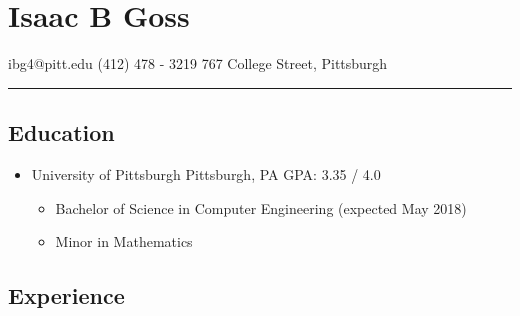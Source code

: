\documentclass[18pt]{article}
\providecommand{\tightlist}{%
    \setlength{\itemsep}{0pt}\setlength{\parskip}{0pt}}
\begin{document}
    
\section*{Isaac B Goss}\label{isaac-b-goss}

ibg4@pitt.edu \textbar{} (412) 478 - 3219 \textbar{} 767 College Street, Pittsburgh
\hrule

\subsection*{Education}\label{education}

\begin{itemize}
\tightlist
\item
  University of Pittsburgh \textbar{} Pittsburgh, PA \textbar{} GPA:
  3.35 / 4.0

  \begin{itemize}
  \tightlist
  \item
    Bachelor of Science in Computer Engineering (expected May 2018)
  \item
    Minor in Mathematics
  \end{itemize}
\end{itemize}

\subsection*{Experience}\label{experience}
\end{document}
